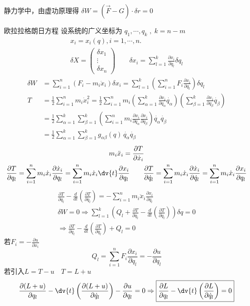 \documentclass[12pt, a4paper, oneside, UTF8]{ctexbook}  %
\newcommand{\pa}{\partial}
\begin{document}
静力学中，由虚功原理得
\(\delta W =(\vec{F}-G)\cdot \delta r =0\)
\begin{thm}
    欧拉\textminus 拉格朗日方程
\noindent
设系统的广义坐标为 \( q_1, \cdots, q_k \;,\; k = n-m\)
\begin{gather*}
    x_i = x_i(q), i=1,\cdots,n.
\\
\delta X = \begin{pmatrix}
\delta x_{1} \\
\vdots \\
\delta x_{n}
\end{pmatrix} \qquad 
\delta x_i = \sum_{l=1}^{k} \frac{\partial x_{i}}{\partial q_{l}} \delta q_{l}
\end{gather*}
\begin{align*}
    \delta W &= \sum_{i=1}^n (F_i - m_i \ddot{x}_i) \delta x_i
    = \sum_{l=1}^k  \left( \sum_{i=1}^n F_i \frac{\partial x_i}{\partial q_l} \right) \delta q_l\\
        T &= \frac{1}{2} \sum_{i=1}^{n} m_{i} \dot{x}_{i}^{2}
    =\frac{1}{2}\sum_{i=1}^{n} m_{i}
    \left(\sum_{\alpha=1}^{k}\frac{\pa x_i}{\pa q_\alpha}\dot{q_\alpha}\right)
    \left(\sum_{\beta=1}^{k}\frac{\pa x_i}{\pa q_\beta}\dot{q_\beta}\right)\\
    &=\frac{1}{2}\sum_{\alpha=1}^{k}\sum_{\beta=1}^{k}
    \left(\sum_{i=1}^{n} m_{i}\frac{\pa x_i}{\pa q_\alpha}
    \frac{\pa x_i}{\pa q_\beta}\right)\dot{q_\alpha}\dot{q_\beta}\\
    &=\frac{1}{2}\sum_{\alpha=1}^{k}\sum_{\beta=1}^{k}
    g_{\alpha\beta}(q)\,
    \dot{q_\alpha}\dot{q_\beta}
\end{align*}
\begin{gather*}
m_{i} \ddot{x}_{i} = \frac{\partial T}{\partial \dot{x}_{i}}
\\
\frac{\partial T}{\partial q_l} = \sum_{i=1}^{n} m_{i} \dot{x}_{i} 
\frac{\partial \dot{x}_{i}}{\partial q_l} 
= \sum_{i=1}^{n} m_i \dot{x}_{i} \dv{t}
\frac{\partial x_{i}}{\partial q_l}
\qquad
\frac{\partial T}{\partial \dot{q}_l} = \sum_{i=1}^{n} m_{i} \dot{x}_{i} 
\frac{\partial \dot{x}_{i}}{\partial \dot{q}_l} 
= \sum_{i=1}^{n} m_i \dot{x}_{i}
\frac{\partial x_{i}}{\partial q_l}
\end{gather*}
\begin{gather*}
\frac{\partial T}{\partial q_l} - \frac{d}{dt} \left( \frac{\partial T}{\partial \dot{q}_l} \right) 
= -\sum_{i=1}^{n} m_{i} \ddot{x}_{i} \frac{\partial x_{i}}{\partial q_l}\\
\delta W=0 \Rightarrow
\sum_{l=1}^{k} \left( Q_{l} + \frac{\partial T}{\partial q_{l}} 
- \frac{d}{dt} \left( \frac{\partial T}{\partial \dot{q}_{l}} \right) \right) \delta q = 0
\\
\Rightarrow \boxed{\frac{\partial T}{\partial \dot{q}_{l}} - \frac{d}{dt} 
\left( \frac{\pa T}{\partial \dot{q}_l} \right) + Q_l = 0}
\end{gather*}
若\(F_i=-\frac{\pa u}{\pa x_i}\)
    \[Q_l=\sum_{i=1}^{n}F_i \frac{\pa x_i}{\pa q_l}=-\frac{\pa u}{\pa q_l}
    \]
若引入\(L=T-u \quad T=L+u\)
\[\frac{\pa (L+u)}{\pa q_l}-\dv{t}\left(\frac{\pa (L+u)}{\pa \dot{q}_l}\right)
-\frac{\pa u}{\pa q_l}=0
\Rightarrow \boxed{\frac{\pa L}{\pa q_l}
-\dv{t}\left(\frac{\pa L}{\pa \dot{q}_l}\right)=0}\]
\end{thm}
\end{document}
